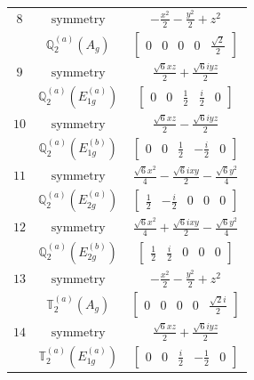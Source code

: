 \documentclass[fleqn,8pt,landscape]{jsarticle}
\begin{document}
\begin{longtable}{ccc}
$ 8 $ & $ \text{symmetry} $ & $ - \frac{x^{2}}{2} - \frac{y^{2}}{2} + z^{2} $ \\
$  $ & $ \mathbb{Q}_{2}^{(a)}(A_{g}) $ & $ \begin{bmatrix} 0 & 0 & 0 & 0 & \frac{\sqrt{2}}{2} \end{bmatrix} $ \\ \hline
$ 9 $ & $ \text{symmetry} $ & $ \frac{\sqrt{6} x z}{2} + \frac{\sqrt{6} i y z}{2} $ \\
$  $ & $ \mathbb{Q}_{2}^{(a)}(E_{1g}^{(a)}) $ & $ \begin{bmatrix} 0 & 0 & \frac{1}{2} & \frac{i}{2} & 0 \end{bmatrix} $ \\ \hline
$ 10 $ & $ \text{symmetry} $ & $ \frac{\sqrt{6} x z}{2} - \frac{\sqrt{6} i y z}{2} $ \\
$  $ & $ \mathbb{Q}_{2}^{(a)}(E_{1g}^{(b)}) $ & $ \begin{bmatrix} 0 & 0 & \frac{1}{2} & - \frac{i}{2} & 0 \end{bmatrix} $ \\ \hline
$ 11 $ & $ \text{symmetry} $ & $ \frac{\sqrt{6} x^{2}}{4} - \frac{\sqrt{6} i x y}{2} - \frac{\sqrt{6} y^{2}}{4} $ \\
$  $ & $ \mathbb{Q}_{2}^{(a)}(E_{2g}^{(a)}) $ & $ \begin{bmatrix} \frac{1}{2} & - \frac{i}{2} & 0 & 0 & 0 \end{bmatrix} $ \\ \hline
$ 12 $ & $ \text{symmetry} $ & $ \frac{\sqrt{6} x^{2}}{4} + \frac{\sqrt{6} i x y}{2} - \frac{\sqrt{6} y^{2}}{4} $ \\
$  $ & $ \mathbb{Q}_{2}^{(a)}(E_{2g}^{(b)}) $ & $ \begin{bmatrix} \frac{1}{2} & \frac{i}{2} & 0 & 0 & 0 \end{bmatrix} $ \\ \hline
$ 13 $ & $ \text{symmetry} $ & $ - \frac{x^{2}}{2} - \frac{y^{2}}{2} + z^{2} $ \\
$  $ & $ \mathbb{T}_{2}^{(a)}(A_{g}) $ & $ \begin{bmatrix} 0 & 0 & 0 & 0 & \frac{\sqrt{2} i}{2} \end{bmatrix} $ \\ \hline
$ 14 $ & $ \text{symmetry} $ & $ \frac{\sqrt{6} x z}{2} + \frac{\sqrt{6} i y z}{2} $ \\
$  $ & $ \mathbb{T}_{2}^{(a)}(E_{1g}^{(a)}) $ & $ \begin{bmatrix} 0 & 0 & \frac{i}{2} & - \frac{1}{2} & 0 \end{bmatrix} $ \\ \hline

\end{longtable}
\end{document}
